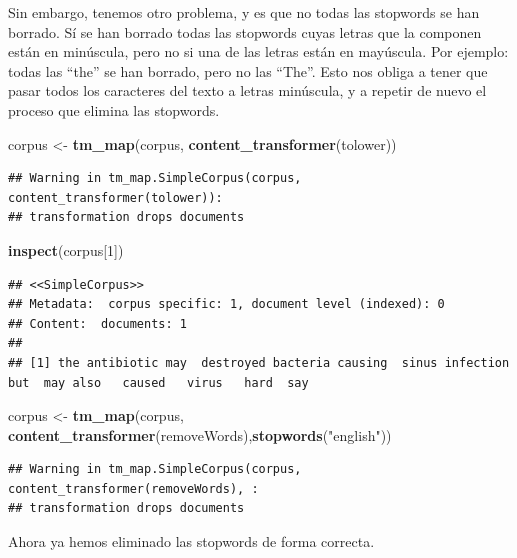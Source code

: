 \documentclass[spanish,]{article}
\newenvironment{Shaded}{\begin{snugshade}}{\end{snugshade}}
\newcommand{\KeywordTok}[1]{\textcolor[rgb]{0.13,0.29,0.53}{\textbf{#1}}}
\newcommand{\DecValTok}[1]{\textcolor[rgb]{0.00,0.00,0.81}{#1}}
\newcommand{\StringTok}[1]{\textcolor[rgb]{0.31,0.60,0.02}{#1}}
\newcommand{\NormalTok}[1]{#1}
\begin{document}
Sin embargo, tenemos otro problema, y es que no todas las stopwords se
han borrado. Sí se han borrado todas las stopwords cuyas letras que la
componen están en minúscula, pero no si una de las letras están en
mayúscula. Por ejemplo: todas las ``the'' se han borrado, pero no las
``The''. Esto nos obliga a tener que pasar todos los caracteres del
texto a letras minúscula, y a repetir de nuevo el proceso que elimina
las stopwords.

\begin{Shaded}
\begin{Highlighting}[]
\NormalTok{corpus <-}\StringTok{ }\KeywordTok{tm_map}\NormalTok{(corpus, }\KeywordTok{content_transformer}\NormalTok{(tolower))}
\end{Highlighting}
\end{Shaded}

\begin{verbatim}
## Warning in tm_map.SimpleCorpus(corpus, content_transformer(tolower)):
## transformation drops documents
\end{verbatim}

\begin{Shaded}
\begin{Highlighting}[]
\KeywordTok{inspect}\NormalTok{(corpus[}\DecValTok{1}\NormalTok{])}
\end{Highlighting}
\end{Shaded}

\begin{verbatim}
## <<SimpleCorpus>>
## Metadata:  corpus specific: 1, document level (indexed): 0
## Content:  documents: 1
## 
## [1] the antibiotic may  destroyed bacteria causing  sinus infection  but  may also   caused   virus   hard  say
\end{verbatim}

\begin{Shaded}
\begin{Highlighting}[]
\NormalTok{corpus <-}\StringTok{ }\KeywordTok{tm_map}\NormalTok{(corpus, }\KeywordTok{content_transformer}\NormalTok{(removeWords),}\KeywordTok{stopwords}\NormalTok{(}\StringTok{"english"}\NormalTok{))}
\end{Highlighting}
\end{Shaded}

\begin{verbatim}
## Warning in tm_map.SimpleCorpus(corpus, content_transformer(removeWords), :
## transformation drops documents
\end{verbatim}

Ahora ya hemos eliminado las stopwords de forma correcta.
\end{document}
